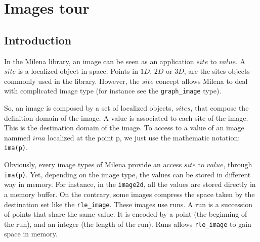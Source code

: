 






\section{Images tour}

\subsection{Introduction}


In the Milena library, an image can be seen as an application
$site$ to $value$.
A $site$ is a localized object in space.
Points in $1D$, $2D$ or $3D$, are the sites objects commonly used in the
library.
However, the $site$ concept allows Milena to deal with complicated image type
(for instance see the \verb+graph_image+ type).

So, an image is composed by a set of localized objects, $sites$, that
compose the definition domain of the image.
A value is associated to each site of the image. This is the destination domain
of the image.
To access to a value of an image nammed $ima$ localized at the point p, we
just use the mathematic notation: \verb+ima(p)+.

Obviously, every image types of Milena provide an access $site$ to $value$,
through \verb+ima(p)+. Yet, depending on the image type, the values can be
stored in different way in memory.
For instance, in the \verb+image2d+, all the values are stored directly in a
memory buffer.
On the contrary, some images compress the space taken by the destination set
like the \verb+rle_image+.
These images use runs.
A run is a succession of points that share the same value. It is encoded by
a point (the beginning of the run), and an integer (the length of the run).
Runs allows \verb+rle_image+ to gain space in memory.\\


